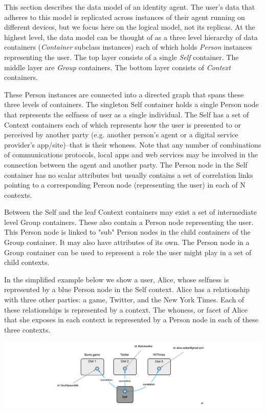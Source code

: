 \documentclass[11pt, oneside]{article}   	%
\begin{document}
This section describes the data model of an identity agent. The user's data that adheres to this model is replicated across instances of their agent running on different devices, but we focus here on the logical model, not its replicas. At the highest level, the data model can be thought of as a three level hierarchy of data containers (\emph{Container} subclass instances) each of which holds \emph{Person} instances representing the user. The top layer consists of a single \emph{Self} container. The middle layer are \emph{Group} containers. The bottom layer consists of \emph{Context} containers.

These Person instances are connected into a directed graph that spans these three levels of containers. The singleton Self container holds a single Person node that represents the selfness of user as a single individual. The Self has a set of Context containers each of which represents how the user is presented to or perceived by another party (e.g. another person's agent or a digital service provider's app/site)--that is their whoness. Note that any number of combinations of communications protocols, local apps and web services may be involved in the connection between the agent and another party. The Person node in the Self container has no scalar attributes but usually contains a set of correlation links pointing to a corresponding Person node (representing the user) in each of N contexts.

Between the Self and the leaf Context containers may exist a set of intermediate level Group containers. These also contain a Person node representing the user. This Person node is linked to "sub" Person nodes in the child containers of the Group container. It may also have attributes of its own. The Person node in a Group container can be used to represent a role the user might play in a set of child contexts. 

In the simplified example below we show a user, Alice, whose selfness is represented by a blue Person node in the Self context. Alice has a relationship with three other parties: a game, Twitter, and the New York Times. Each of these relationships is represented by a context. The whoness, or facet of Alice that she exposes in each context is represented by a Person node in each of these three contexts.

\includegraphics[width=\textwidth]{./images/example1.png}
\end{document}
